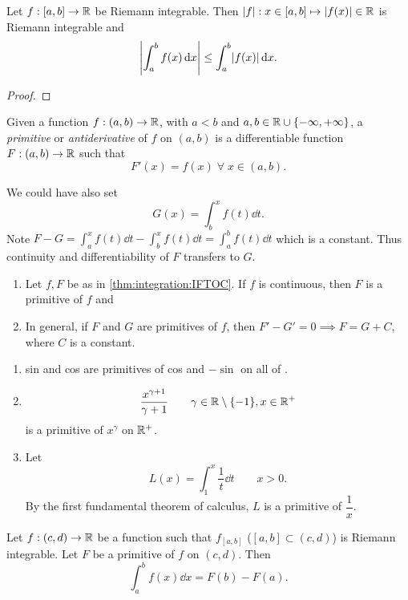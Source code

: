 \begin{thm} \label{thm:integral triangle}
    Let $f : [a, b] \to \mathbb{R}$ be Riemann integrable.
    Then $\abs{f} : x \in [a, b] \mapsto \abs{f(x)} \in \R$ is Riemann integrable and \[
        \abs{\int_{a}^{b} f(x) \dd x} \leq \int_{a}^{b} \abs{f(x)} \dd x.
    \]
\end{thm}
\begin{proof}
\end{proof}

\begin{defn}[Primitive] \label{defn:primitive}
    Given a function $f : (a, b) \to \mathbb{R}$, with $a < b$ and $a, b \in \R \cup \set{-\infty, +\infty}$, a \emph{primitive} or \emph{antiderivative} of $f$ on $(a, b)$ is a differentiable function $F : (a, b) \to \mathbb{R}$ such that \[
        F'(x) = f(x) \;\forall\; x \in (a, b).
    \]
\end{defn}
\begin{rem}
    We could have also set \[
        G(x) = \int_{b}^{x} f(t) \dd t.
    \] Note $F - G = \int_{a}^{x} f(t) \dd t - \int_{b}^{x} f(t) \dd t = \int_{a}^{b} f(t) \dd t$ which is a constant.
    Thus continuity and differentiability of $F$ transfers to $G$.
\end{rem}
\begin{rem} \leavevmode
    \begin{enumerate}[label=(\alph*)]
        \item Let $f, F$ be as in \cref{thm:integration:IFTOC}.
        If $f$ is continuous, then $F$ is a primitive of $f$ and 
        \item In general, if $F$ and $G$ are primitives of $f$, then $F' - G' = 0 \implies F = G + C$, where $C$ is a constant.
    \end{enumerate}
\end{rem}
\begin{example} \leavevmode
    \begin{enumerate}[label=(\alph*)]
        \item sin and cos are primitives of cos and $-\sin$ on all of \R.
        \item \[
            \frac{x^{\gamma + 1}}{\gamma + 1} \qquad \gamma \in \R \setminus \set{-1}, x \in \R^{+}
        \] is a primitive of $x^{\gamma}$ on $\mathbb{R}^{+}$.
        \item Let \[
            L(x) = \int_{1}^{x} \frac{1}{t} \dd t \qquad x > 0.
        \] By the first fundamental theorem of calculus, $L$ is a primitive of $\dfrac{1}{x}$.
    \end{enumerate}
\end{example}

\begin{thm} \label{thm:second ftoc}
    Let $f : (c, d) \to \mathbb{R}$ be a function such that $f_{[a, b]}$ ($[a, b] \subset (c, d)$) is Riemann integrable. Let $F$ be a primitive of $f$ on $(c, d)$. Then \[
        \int_{a}^{b} f(x) \dd x = F(b) - F(a).
    \]
\end{thm}

